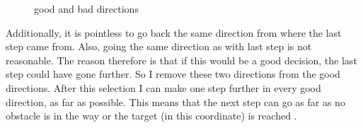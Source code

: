 \begin{figure}
	\centering
	
  	\caption{good and bad directions}
	\label{fig:router_good_bad_direction}
\end{figure}

Additionally, it is pointless to go back the same direction from where the last step came from. Also, going the same direction as with last step is not reasonable. The reason therefore is that if this would be a good decision, the last step could have gone further. So I remove these two directions from the good directions. After this selection I can make one step further in every good direction, as far as possible. This means that the next step can go as far as no obstacle is in the way or the target (in this coordinate) is reached .

